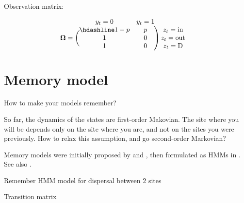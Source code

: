 \documentclass[
  12pt,
]{krantz}
\begin{document}
Observation matrix:

\[
  \begin{matrix}
& \\
\mathbf{\Omega} =
  \left ( \vphantom{ \begin{matrix} 12 \\ 12 \end{matrix} } \right .
          \end{matrix}
          \hspace{-1.2em}
          \begin{matrix}
          y_t=0 & y_t=1 \\ \hdashline
          1 - p & p\\
          1 & 0\\
          1 & 0
          \end{matrix}
          \hspace{-0.2em}
          \begin{matrix}
          & \\
          \left . \vphantom{ \begin{matrix} 12 \\ 12 \\ 12 \end{matrix} } \right )
\begin{matrix}
z_{t}=\text{in} \\ z_{t}=\text{out} \\ z_{t}=\text{D}
\end{matrix}
\end{matrix}
\]

\hypertarget{memory-model}{%
\section{Memory model}\label{memory-model}}

How to make your models remember?

So far, the dynamics of the states are first-order Makovian. The site where you will be depends only on the site where you are, and not on the sites you were previously. How to relax this assumption, and go second-order Markovian?

Memory models were initially proposed by \citet{hestbeck1991estimates} and \citet{BrownieEtAl1993}, then formulated as HMMs in \citet{rouan2009memory}. See also \citet{cole2014}.

Remember HMM model for dispersal between 2 sites

Transition matrix
\end{document}

